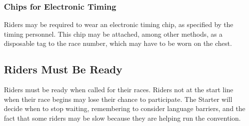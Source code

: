 \subsubsection{Chips for Electronic Timing}
	Riders may be required to wear an electronic timing chip, as specified by the timing personnel.
	This chip may be attached, among other methods, as a disposable tag to the race number, which may have to be worn on the chest.

\subsection{Riders Must Be Ready}

Riders must be ready when called for their races.
Riders not at the start line when their race begins may lose their chance to participate.
The Starter will decide when to stop waiting, remembering to consider language barriers, and the fact that some riders may be slow because they are helping run the convention.

